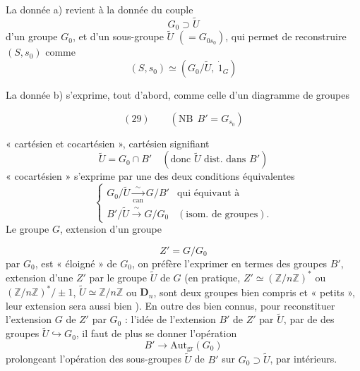 \documentclass[11pt,a4paper]{article}
\begin{document}

La donnée a) revient à la donnée du couple
\[
G_0\supset\tilde{U} \tag{27}
\]
d'un groupe $G_0$, et d'un sous-groupe $\tilde{U}$ $(=G_{0s_0})$, qui permet de reconstruire $(S,s_0)$ comme
\[
(S,s_0)\simeq(G_0/\tilde{U},\ \dot{1}_G) \tag{28}
\]

La donnée b) s'exprime, tout d'abord, comme celle d'un diagramme de groupes


\[
(29) \qquad (\mathrm{NB}\ \ B'=G_{s_0})
\]

« cartésien et cocartésien », cartésien signifiant
\[
\tilde{U}=G_0\cap B' \quad (\text{donc } \tilde{U} \text{ dist. dans } B') \tag{30}
\]
« cocartésien » s'exprime par une des deux conditions équivalentes
\[
\left\{
\begin{array}{ll}
G_0/\tilde{U} \xrightarrow[\text{can}]{\ \sim\ } G/B' & \text{qui équivaut à}\\[2pt]
B'/\tilde{U} \xrightarrow{\ \sim\ } G/G_0 & (\text{isom. de groupes}).
\end{array}\right. \tag{31}
\]
Le groupe $G$, extension d'un groupe

\[
Z'=G/G_0 \tag{32}
\]
par $G_0$, est   « éloigné »  de $G_0$, on préfère l'exprimer en termes des groupes $B'$, extension d'une  $Z'$ par le groupe  $\tilde{U}$ de $G$ (en pratique, $Z'\simeq(\mathbb{Z}/n\mathbb{Z})^*$ ou $(\mathbb{Z}/n\mathbb{Z})^*/\pm1$, $\tilde{U}\simeq\mathbb{Z}/n\mathbb{Z}$ ou $\mathbf{D}_n$, sont deux groupes bien compris et « petits », leur extension sera aussi bien ). En outre des  bien connus, pour reconstituer l'extension $G$ de $Z'$ par $G_0$ : l'idée de l'extension $B'$ de $Z'$ par $\tilde{U}$, par   de \struck{\ill{}}  des groupes  $\tilde{U}\hookrightarrow G_0$, il faut de plus se donner l'opération
\[
B'\longrightarrow \mathrm{Aut}_{\mathrm{gr}}(G_0) \tag{33}
\]
prolongeant l'opération  des sous-groupes $\tilde{U}$ de $B'$ sur $G_0\supset\tilde{U}$, par  intérieurs.
\end{document}
